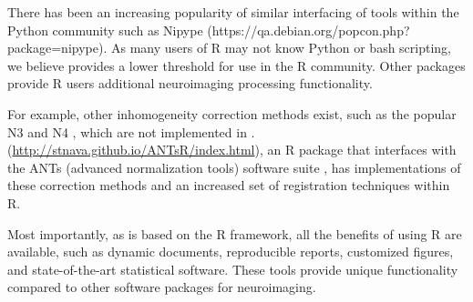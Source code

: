 There has been an increasing popularity of similar interfacing of tools within the Python community such as Nipype \citep{gorgolewski_nipype:_2011} (https://qa.debian.org/popcon.php?package=nipype).  As many users of R may not know Python or bash scripting, we believe  provides a lower threshold for use in the R community.  Other packages provide R users additional neuroimaging processing functionality.   

For example, other inhomogeneity correction methods exist, such as the popular N3 \citep{sled_nonparametric_1998} and N4 \citep{tustison_n4itk:_2010}, which are not implemented in .  (\url{http://stnava.github.io/ANTsR/index.html}), an R package that interfaces with the ANTs (advanced normalization tools) software suite \citep{avants_reproducible_2011}, has implementations of these correction methods and an increased set of registration techniques within R.


Most importantly, as  is based on the R framework, all the benefits of using R are available, such as dynamic documents, reproducible reports, customized figures, and state-of-the-art statistical software.  These tools provide unique functionality compared to other software packages for neuroimaging.  


%







